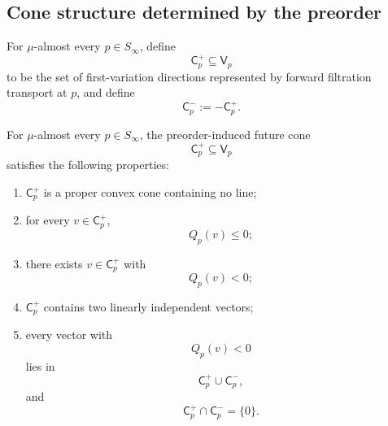 \subsection{Cone structure determined by the preorder}
\begin{definition}
	For \(\mu\)-almost every \(p\in S_\infty\), define
	\[
		\mathsf C_p^+\subseteq \mathsf V_p
	\]
	to be the set of first-variation directions represented by forward
	filtration transport at \(p\), and define
	\[
		\mathsf C_p^-:=-\mathsf C_p^+.
	\]
\end{definition}
\begin{theorem}
	\label{thm:cone-compat}
	For \(\mu\)-almost every \(p\in S_\infty\), the preorder-induced future
	cone
	\[
		\mathsf C_p^+\subseteq \mathsf V_p
	\]
	satisfies the following properties:
	\begin{enumerate}[label=\textup{(C\arabic*)}]
		\item \label{C1}
		      \(\mathsf C_p^+\) is a proper convex cone containing no line;
		\item \label{C2}
		      for every \(v\in \mathsf C_p^+\),
		      \[
			      Q_p(v)\le 0;
		      \]
		\item \label{C3}
		      there exists \(v\in \mathsf C_p^+\) with
		      \[
			      Q_p(v)<0;
		      \]
		\item \label{C4}
		      \(\mathsf C_p^+\) contains two linearly independent vectors;
		\item \label{C5}
		      every vector with
		      \[
			      Q_p(v)<0
		      \]
		      lies in
		      \[
			      \mathsf C_p^+\cup \mathsf C_p^-,
		      \]
		      and
		      \[
			      \mathsf C_p^+\cap \mathsf C_p^-=\{0\}.
		      \]
	\end{enumerate}
\end{theorem}

